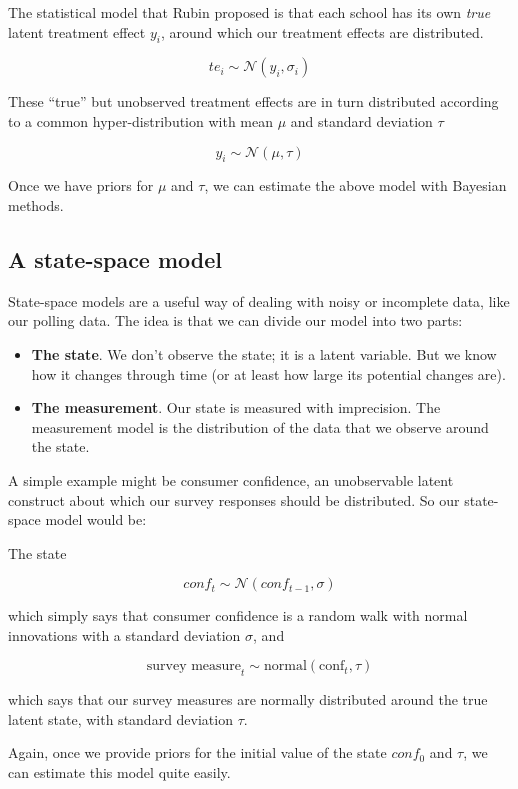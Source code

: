 \documentclass[]{book}
\providecommand{\tightlist}{%
  \setlength{\itemsep}{0pt}\setlength{\parskip}{0pt}}
\begin{document}
The statistical model that Rubin proposed is that each school has its
own \emph{true} latent treatment effect \(y_{i}\), around which our
treatment effects are distributed.

\[
te_{i} \sim \mathcal{N}(y_{i}, \sigma_{i})
\]

These ``true'' but unobserved treatment effects are in turn distributed
according to a common hyper-distribution with mean \(\mu\) and standard
deviation \(\tau\)

\[
y_{i} \sim \mathcal{N}(\mu, \tau)
\]

Once we have priors for \(\mu\) and \(\tau\), we can estimate the above
model with Bayesian methods.

\subsection{A state-space model}\label{a-state-space-model}

State-space models are a useful way of dealing with noisy or incomplete
data, like our polling data. The idea is that we can divide our model
into two parts:

\begin{itemize}
\tightlist
\item
  \textbf{The state}. We don't observe the state; it is a latent
  variable. But we know how it changes through time (or at least how
  large its potential changes are).
\item
  \textbf{The measurement}. Our state is measured with imprecision. The
  measurement model is the distribution of the data that we observe
  around the state.
\end{itemize}

A simple example might be consumer confidence, an unobservable latent
construct about which our survey responses should be distributed. So our
state-space model would be:

The state

\[
conf_{t} \sim \mathcal{N}(conf_{t-1}, \sigma)
\]

which simply says that consumer confidence is a random walk with normal
innovations with a standard deviation \(\sigma\), and

\[
\mbox{survey measure}_{t} \sim \mbox{normal}(\mbox{conf}_{t}, \tau)
\]

which says that our survey measures are normally distributed around the
true latent state, with standard deviation \(\tau\).

Again, once we provide priors for the initial value of the state
\(conf_{0}\) and \(\tau\), we can estimate this model quite easily.
\end{document}
